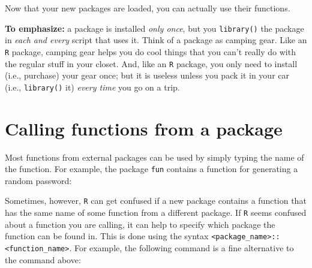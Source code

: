 \documentclass[
]{book}
\newenvironment{Shaded}{\begin{snugshade}}{\end{snugshade}}
\newcommand{\AttributeTok}[1]{\textcolor[rgb]{0.77,0.63,0.00}{#1}}
\newcommand{\DecValTok}[1]{\textcolor[rgb]{0.00,0.00,0.81}{#1}}
\newcommand{\FunctionTok}[1]{\textcolor[rgb]{0.00,0.00,0.00}{#1}}
\newcommand{\NormalTok}[1]{#1}
\newcommand{\SpecialCharTok}[1]{\textcolor[rgb]{0.00,0.00,0.00}{#1}}
\newcommand{\StringTok}[1]{\textcolor[rgb]{0.31,0.60,0.02}{#1}}
\begin{document}
Now that your new packages are loaded, you can actually use their functions.

\textbf{To emphasize:} a package is installed \emph{only once}, but you \texttt{library()} the package in \emph{each and every} script that uses it. Think of a package as camping gear. Like an \texttt{R} package, camping gear helps you do cool things that you can't really do with the regular stuff in your closet. And, like an \texttt{R} package, you only need to install (i.e., purchase) your gear once; but it is useless unless you pack it in your car (i.e., \texttt{library()} it) \emph{every time} you go on a trip.

\hypertarget{calling-functions-from-a-package}{%
\section*{Calling functions from a package}\label{calling-functions-from-a-package}}

Most functions from external packages can be used by simply typing the name of the function. For example, the package \texttt{fun} contains a function for generating a random password:

\begin{Shaded}
\end{Shaded}

Sometimes, however, \texttt{R} can get confused if a new package contains a function that has the same name of some function from a different package. If \texttt{R} seems confused about a function you are calling, it can help to specify which package the function can be found in. This is done using the syntax \texttt{\textless{}package\_name\textgreater{}::\textless{}function\_name\textgreater{}}. For example, the following command is a fine alternative to the command above:

\begin{Shaded}
\begin{Highlighting}[]
\NormalTok{fun}\SpecialCharTok{::}\FunctionTok{random\_password}\NormalTok{(}\AttributeTok{length=}\DecValTok{24}\NormalTok{)}
\NormalTok{[}\DecValTok{1}\NormalTok{] }\StringTok{"$b+9qViRM\textasciitilde{}C|XQpz3U\{6\textgreater{}f]K"}
\end{Highlighting}
\end{Shaded}
\end{document}
